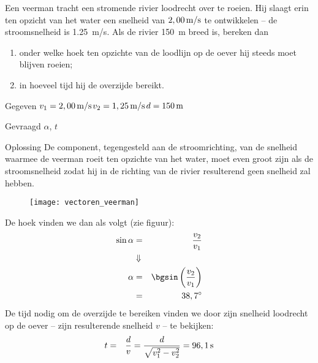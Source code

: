


\item Een veerman tracht een stromende rivier loodrecht over te roeien. Hij slaagt erin ten opzicht van het water een snelheid van $2,00\rm\,m/s$ te ontwikkelen -- de stroomsnelheid is \SI{1,25}{m/s}. Als de rivier \SI{150}{m} breed is, bereken dan
\begin{enumerate}
\item onder welke hoek ten opzichte van de loodlijn op de oever hij steeds moet blijven roeien;
\item in hoeveel tijd hij de overzijde bereikt.
\end{enumerate}
\begin{oplossing}
\item[Gegeven]$v_1=2,00\rm\,m/s$\newline$v_2=1,25\rm\,m/s$\newline$d=150\rm\,m$
\item[Gevraagd]$\alpha$, $t$
\item[Oplossing]De component, tegengesteld aan de stroomrichting, van de snelheid waarmee de veerman roeit ten opzichte van het water, moet even groot zijn als de stroomsnelheid zodat hij in de richting van de rivier resulterend
geen snelheid zal hebben. 
\begin{figure}[h]
\centering
\texttt{[image: vectoren\_veerman]}
\end{figure}
\newline
De hoek vinden we dan als volgt (zie figuur):
\begin{eqnarray*}
\sin{\alpha}&=&\frac{v_2}{v_1}\\
&\Downarrow&\\
\alpha&=&\bgsin\left(\frac{v_2}{v_1}\right)\\
&=&38,7^\circ
\end{eqnarray*}
De tijd nodig om de overzijde te bereiken vinden we door zijn snelheid loodrecht op de oever -- zijn resulterende snelheid $v$ -- te bekijken:
\begin{eqnarray*}
t&=&\frac{d}{v}=\frac{d}{\sqrt{v_1^2-v_2^2}}=96,1{\rm\,s}
\end{eqnarray*}
\end{oplossing}